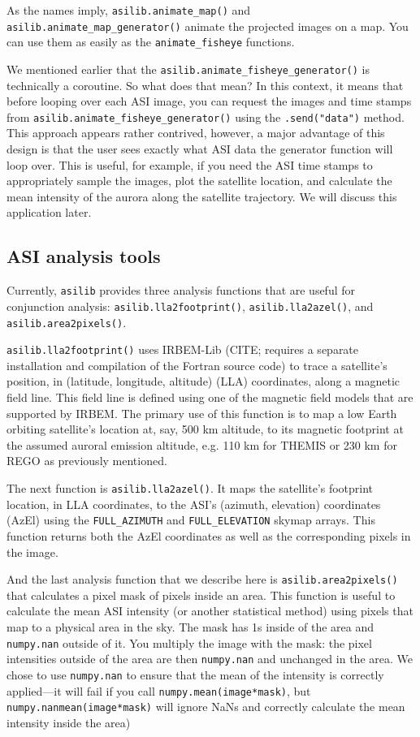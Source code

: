 \documentclass[draft]{agujournal2019}
\begin{document}
As the names imply, \verb|asilib.animate_map()| and \verb|asilib.animate_map_generator()| animate the projected images on a map. You can use them as easily as the \verb|animate_fisheye| functions. 

We mentioned earlier that the \verb|asilib.animate_fisheye_generator()| is technically a coroutine. So what does that mean? In this context, it means that before looping over each ASI image, you can request the images and time stamps from \verb|asilib.animate_fisheye_generator()| using the \verb|.send("data")| method. This approach appears rather contrived, however, a major advantage of this design is that the user sees exactly what ASI data the generator function will loop over. This is useful, for example, if you need the ASI time stamps to appropriately sample the images, plot the satellite location, and calculate the mean intensity of the aurora along the satellite trajectory. We will discuss this application later.

\subsection{ASI analysis tools}
Currently, \verb|asilib| provides three analysis functions that are useful for conjunction analysis: \verb|asilib.lla2footprint()|, \verb|asilib.lla2azel()|, and \verb|asilib.area2pixels()|.

\verb|asilib.lla2footprint()| uses IRBEM-Lib (CITE; requires a separate installation and compilation of the Fortran source code) to trace a satellite's position, in (latitude, longitude, altitude) (LLA) coordinates, along a magnetic field line. This field line is defined using one of the magnetic field models that are supported by IRBEM. The primary use of this function is to map a low Earth orbiting satellite's location at, say, 500 km altitude, to its magnetic footprint at the assumed auroral emission altitude, e.g. 110 km for THEMIS or 230 km for REGO as previously mentioned.

The next function is \verb|asilib.lla2azel()|. It maps the satellite's footprint location, in LLA coordinates, to the ASI's (azimuth, elevation) coordinates (AzEl) using the \verb|FULL_AZIMUTH| and \verb|FULL_ELEVATION| skymap arrays. This function returns both the AzEl coordinates as well as the corresponding pixels in the image.

And the last analysis function that we describe here is \verb|asilib.area2pixels()| that calculates a pixel mask of pixels inside an area. This function is useful to calculate the mean ASI intensity (or another statistical method) using pixels that map to a physical area in the sky. The mask has 1s inside of the area and \verb|numpy.nan| outside of it. You multiply the image with the mask: the pixel intensities outside of the area are then \verb|numpy.nan| and unchanged in the area. We chose to use \verb|numpy.nan| to ensure that the mean of the intensity is correctly applied---it will fail if you call \verb|numpy.mean(image*mask)|, but \verb|numpy.nanmean(image*mask)| will ignore NaNs and correctly calculate the mean intensity inside the area)
\end{document}

